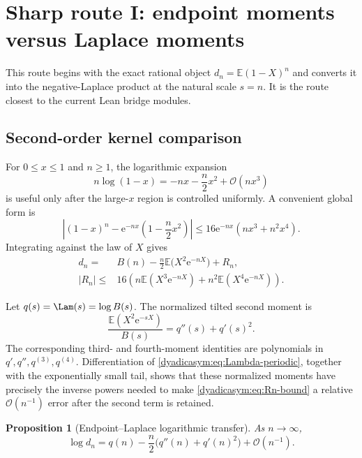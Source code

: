 \documentclass[11pt,oneside]{article}
\newtheorem{proposition}[proposition]{Proposition}
\theoremstyle{definition}
\theoremstyle{remark}
\newcommand{\e}{\mathrm e}
\newcommand{\E}{\mathbb E}
\newcommand{\bigO}{\mathcal O}
\begin{document}
\section{Sharp route I: endpoint moments versus Laplace moments}
\label{dyadicasym:sec:endpoint-laplace}

This route begins with the exact rational object $d_n=\E(1-X)^n$ and converts it into the
negative-Laplace product at the natural scale $s=n$.  It is the route closest to the current
Lean bridge modules.

\subsection{Second-order kernel comparison}

For $0\le x\le1$ and $n\ge1$, the logarithmic expansion
\begin{equation*}
 n\log(1-x)=-nx-\frac n2x^2+\bigO(nx^3)
\end{equation*}
is useful only after the large-$x$ region is controlled uniformly.  A convenient global
form is
\begin{equation}
 \left|(1-x)^n-\e^{-nx}\left(1-\frac n2x^2\right)\right|
 \le16\e^{-nx}(nx^3+n^2x^4).                               \label{dyadicasym:eq:kernel-comparison}
\end{equation}
Integrating against the law of $X$ gives
\begin{align}
 d_n={}&B(n)-\frac n2\E\bigl(X^2\e^{-nX}\bigr)+R_n,        \label{dyadicasym:eq:dn-B-second}\\
 |R_n|\le{}&16\left(
 n\E(X^3\e^{-nX})+n^2\E(X^4\e^{-nX})\right).              \label{dyadicasym:eq:Rn-bound}
\end{align}

Let $q(s)=\Lam(s)=\log B(s)$.  The normalized tilted second moment is
\begin{equation}
 \frac{\E(X^2\e^{-sX})}{B(s)}=q''(s)+q'(s)^2.               \label{dyadicasym:eq:tilted-second}
\end{equation}
The corresponding third- and fourth-moment identities are polynomials in
$q',q'',q^{(3)},q^{(4)}$.  Differentiation of \eqref{dyadicasym:eq:Lambda-periodic}, together with the
exponentially small tail, shows that these normalized moments have precisely the inverse
powers needed to make \eqref{dyadicasym:eq:Rn-bound} a relative $\bigO(n^{-1})$ error after the second
term is retained.

\begin{proposition}[Endpoint--Laplace logarithmic transfer]
\label{dyadicasym:prop:endpoint-laplace-transfer}
As $n\to\infty$,
\begin{equation}
 \boxed{
 \log d_n=q(n)-\frac n2\bigl(q''(n)+q'(n)^2\bigr)
 +\bigO(n^{-1}).}                                          \label{dyadicasym:eq:log-d-transfer}
\end{equation}
\end{proposition}
\end{document}

